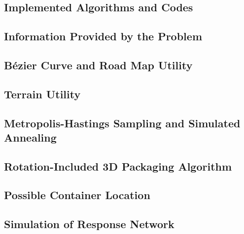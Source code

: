 \documentclass{mcmthesis}
\begin{document}
\begin{appendices}
\section{Implemented Algorithms and Codes}

\subsection{Information Provided by the Problem}


\subsection{B\'{e}zier Curve and Road Map Utility }


\subsection{Terrain Utility}\label{App:terr}


\subsection{Metropolis-Hastings Sampling and Simulated Annealing}\label{App:metr}


\subsection{Rotation-Included 3D Packaging Algorithm}\label{App:rota}



\subsection{Possible Container Location}\label{App:poss}


\subsection{Simulation of Response Network}

\end{appendices}
\end{document}
